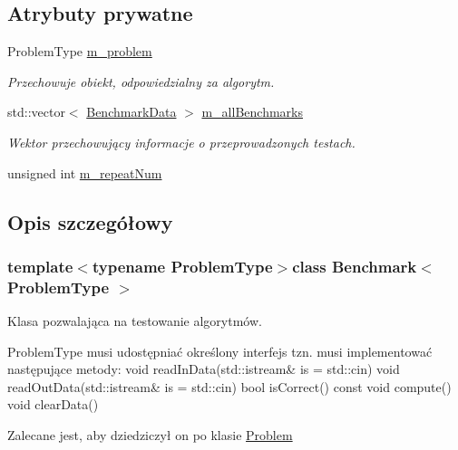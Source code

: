 \subsection*{Atrybuty prywatne}
\begin{DoxyCompactItemize}
\item 
Problem\-Type \hyperlink{class_benchmark_a3757139b2e5a299b831471e0d43f5f6b}{m\-\_\-problem}
\begin{DoxyCompactList}\small\item\em Przechowuje obiekt, odpowiedzialny za algorytm. \end{DoxyCompactList}\item 
std\-::vector$<$ \hyperlink{struct_benchmark_data}{Benchmark\-Data} $>$ \hyperlink{class_benchmark_a411654a4e38e256597715a627756b975}{m\-\_\-all\-Benchmarks}
\begin{DoxyCompactList}\small\item\em Wektor przechowujący informacje o przeprowadzonych testach. \end{DoxyCompactList}\item 
unsigned int \hyperlink{class_benchmark_ad2c6e23af9c3a8c8592bbeabeb6e1a6d}{m\-\_\-repeat\-Num}
\end{DoxyCompactItemize}


\subsection{Opis szczegółowy}
\subsubsection*{template$<$typename Problem\-Type$>$class Benchmark$<$ Problem\-Type $>$}

Klasa pozwalająca na testowanie algorytmów. 

Problem\-Type musi udostępniać określony interfejs tzn. musi implementować następujące metody\-: void read\-In\-Data(std\-::istream\& is = std\-::cin) void read\-Out\-Data(std\-::istream\& is = std\-::cin) bool is\-Correct() const void compute() void clear\-Data()

Zalecane jest, aby dziedziczył on po klasie \hyperlink{class_problem}{Problem} 

